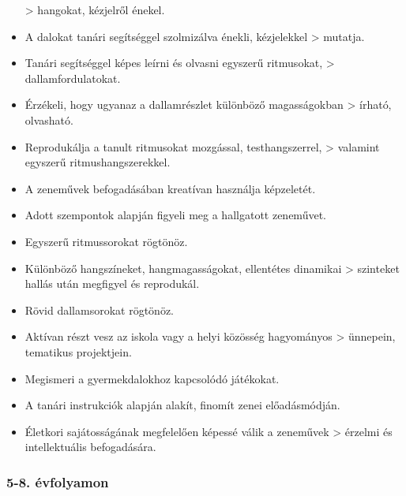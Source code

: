 \begin{itemize}
  \textgreater{} hangokat, kézjelről énekel.
\item
  A dalokat tanári segítséggel szolmizálva énekli, kézjelekkel
  \textgreater{} mutatja.
\item
  Tanári segítséggel képes leírni és olvasni egyszerű ritmusokat,
  \textgreater{} dallamfordulatokat.
\item
  Érzékeli, hogy ugyanaz a dallamrészlet különböző magasságokban
  \textgreater{} írható, olvasható.
\item
  Reprodukálja a tanult ritmusokat mozgással, testhangszerrel,
  \textgreater{} valamint egyszerű ritmushangszerekkel.
\item
  A zeneművek befogadásában kreatívan használja képzeletét.
\item
  Adott szempontok alapján figyeli meg a hallgatott zeneművet.
\item
  Egyszerű ritmussorokat rögtönöz.
\item
  Különböző hangszíneket, hangmagasságokat, ellentétes dinamikai
  \textgreater{} szinteket hallás után megfigyel és reprodukál.
\item
  Rövid dallamsorokat rögtönöz.
\item
  Aktívan részt vesz az iskola vagy a helyi közösség hagyományos
  \textgreater{} ünnepein, tematikus projektjein.
\item
  Megismeri a gyermekdalokhoz kapcsolódó játékokat.
\item
  A tanári instrukciók alapján alakít, finomít zenei előadásmódján.
\item
  Életkori sajátosságának megfelelően képessé válik a zeneművek
  \textgreater{} érzelmi és intellektuális befogadására.
\end{itemize}

\hypertarget{evfolyamon-12}{%
\subsubsection{5-8. évfolyamon}\label{evfolyamon-12}}

